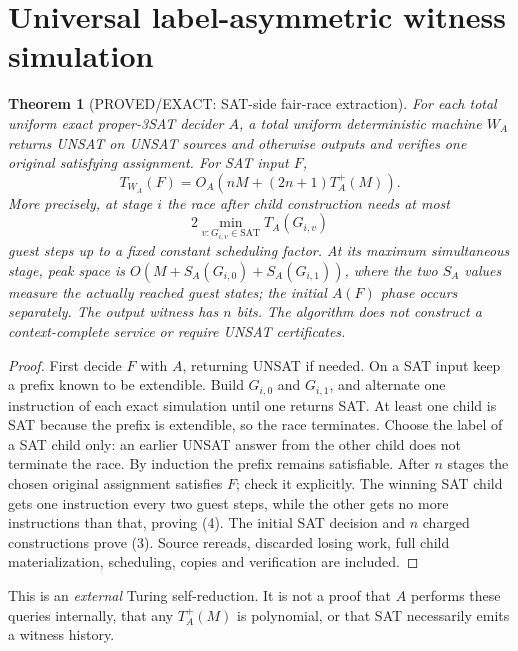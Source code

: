 \documentclass[11pt]{article}
\newtheorem{theorem}{Theorem}
\begin{document}
\section{Universal label-asymmetric witness simulation}
\begin{theorem}[PROVED/EXACT: SAT-side fair-race extraction]\label{th:race}
For each total uniform exact proper-3SAT decider $A$, a total uniform deterministic machine $W_A$ returns UNSAT on UNSAT sources and otherwise outputs and verifies one original satisfying assignment. For SAT input $F$,
\[
T_{W_A}(F)=O_A(nM+(2n+1)T_A^+(M)).
\tag{3}
\]
More precisely, at stage $i$ the race after child construction needs at most
\[
2\min_{v:G_{i,v}\in\mathrm{SAT}}T_A(G_{i,v})
\tag{4}
\]
guest steps up to a fixed constant scheduling factor. At its maximum simultaneous stage, peak space is $O(M+S_A(G_{i,0})+S_A(G_{i,1}))$, where the two $S_A$ values measure the actually reached guest states; the initial $A(F)$ phase occurs separately. The output witness has $n$ bits. The algorithm does \emph{not} construct a context-complete service or require UNSAT certificates.
\end{theorem}
\begin{proof}
First decide $F$ with $A$, returning UNSAT if needed. On a SAT input keep a prefix known to be extendible. Build $G_{i,0}$ and $G_{i,1}$, and alternate one instruction of each exact simulation until one returns SAT. At least one child is SAT because the prefix is extendible, so the race terminates. Choose the label of a SAT child only: an earlier UNSAT answer from the other child does not terminate the race. By induction the prefix remains satisfiable. After $n$ stages the chosen original assignment satisfies $F$; check it explicitly. The winning SAT child gets one instruction every two guest steps, while the other gets no more instructions than that, proving (4). The initial SAT decision and $n$ charged constructions prove (3). Source rereads, discarded losing work, full child materialization, scheduling, copies and verification are included.
\end{proof}
This is an \emph{external} Turing self-reduction. It is not a proof that $A$ performs these queries internally, that any $T_A^+(M)$ is polynomial, or that SAT necessarily emits a witness history.
\end{document}
